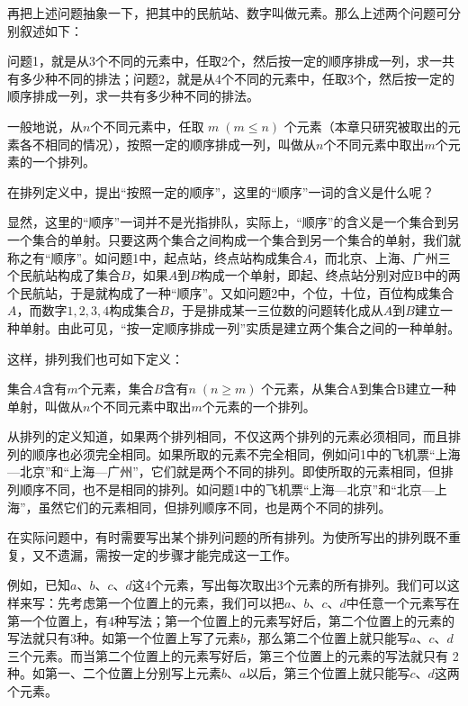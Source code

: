 再把上述问题抽象一下，把其中的民航站、数字叫做元素。那么上述两个问题可分别叙述如下：

问题1，就是从3个不同的元素中，任取2个，然后按一定的顺序排成一列，求一共有多少种不同的排法；问题2，就是从4个不同的元素中，任取3个，然后按一定的顺序排成一列，求一共有多少种不同的排法。

一般地说，从$n$个不同元素中，任取 $m\; (m\le  n)$ 个元素（本章只研究被取出的元素各不相同的情况），按照一定的顺序排成一列，叫做从$n$个不同元素中取出$m$个元素的一个排列。

\begin{remark}
    在排列定义中，提出“按照一定的顺序”，这里的“顺序”一词的含义是什么呢？

显然，这里的“顺序”一词并不是光指排队，实际上，“顺序”的含义是一个集合到另一个集合的单射。只要这两个集合之间构成一个集合到另一个集合的单射，我们就称之有“顺序”。如问题1中，起点站，终点站构成集合$A$，而北京、上海、广州三个民航站构成了集合$B$，如果$A$到$B$构成一个单射，即起、终点站分别对应B中的两个民航站，于是就构成了一种“顺序”。又如问题2中，个位，十位，百位构成集合$A$，而数字$1,2,3,4$构成集合$B$，于是排成某一三位数的问题转化成从$A$到$B$建立一种单射。由此可见，“按一定顺序排成一列”实质是建立两个集合之间的一种单射。

这样，排列我们也可如下定义：

集合$A$含有$m$个元素，集合$B$含有$n\; (n\ge m)$ 个元素，从集合A到集合B建立一种单射，叫做从$n$个不同元素中取出$m$个元素的一个排列。
\end{remark}


从排列的定义知道，如果两个排列相同，不仅这两个排列的元素必须相同，而且排列的顺序也必须完全相同。如果所取的元素不完全相同，例如问1中的飞机票“上海—北京”和“上海—广州”，它们就是两个不同的排列。即使所取的元素相同，但排列顺序不同，也不是相同的排列。如问题1中的飞机票“上海—北京”和“北京—上海”，虽然它们的元素相同，但排列顺序不同，也是两个不同的排列。

在实际问题中，有时需要写出某个排列问题的所有排列。为使所写出的排列既不重复，又不遗漏，需按一定的步骤才能完成这一工作。

例如，已知$a$、$b$、$c$、$d$这4个元素，写出每次取出3个元素的所有排列。我们可以这样来写：先考虑第一个位置上的元素，我们可以把$a$、$b$、$c$、$d$中任意一个元素写在第一个位置上，有4种写法；第一个位置上的元素写好后，第二个位置上的元素的写法就只有3种。如第一个位置上写了元素$b$，那么第二个位置上就只能写$a$、$c$、$d$三个元素。而当第二个位置上的元素写好后，第三个位置上的元素的写法就只有 2种。如第一、二个位置上分别写上元素$b$、$a$以后，第三个位置上就只能写$c$、$d$这两个元素。

